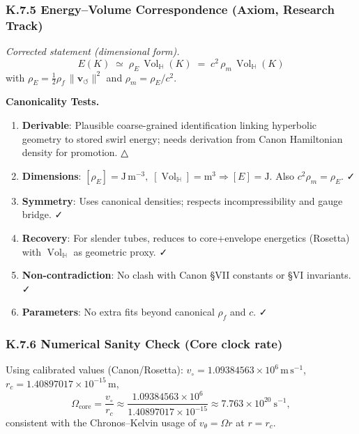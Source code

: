 \documentclass[10pt,reprint,aps,onecolumn,nofootinbib]{revtex4-2}
\newcommand{\Vol}{\operatorname{Vol}}   %
\begin{document}
    \subsubsection*{K.7.5 Energy–Volume Correspondence (Axiom, Research Track)}
    \emph{Corrected statement (dimensional form).}
    \[
        \boxed{\;E(K)\;\simeq\;\rho_{\!E}\,\Vol_{\!\mathbb{H}}(K)\;=\;c^{2}\,\rho_{\!m}\,\Vol_{\!\mathbb{H}}(K)\;}
    \]
    with $\rho_{\!E}=\tfrac12 \rho_{\!f}\,\lVert \mathbf{v}_{\!\boldsymbol{\circlearrowleft}}\rVert^{2}$ and $\rho_{\!m}=\rho_{\!E}/c^{2}$.

    \textbf{Canonicality Tests.}
    \begin{enumerate}
        \item \textbf{Derivable}: Plausible coarse-grained identification linking hyperbolic geometry to stored swirl energy; needs derivation from Canon Hamiltonian density for promotion. △
        \item \textbf{Dimensions}: $[\rho_{\!E}]=\mathrm{J\,m^{-3}},\; [\Vol_{\!\mathbb{H}}]=\mathrm{m^3}\Rightarrow [E]=\mathrm{J}$. Also $c^{2}\rho_{\!m}=\rho_{\!E}$. ✓
        \item \textbf{Symmetry}: Uses canonical densities; respects incompressibility and gauge bridge. ✓
        \item \textbf{Recovery}: For slender tubes, reduces to core+envelope energetics (Rosetta) with $\Vol_{\!\mathbb{H}}$ as geometric proxy. ✓
        \item \textbf{Non-contradiction}: No clash with Canon §VII constants or §VI invariants. ✓
        \item \textbf{Parameters}: No extra fits beyond canonical $\rho_{\!f}$ and $c$. ✓
    \end{enumerate}

    \subsubsection*{K.7.6 Numerical Sanity Check (Core clock rate)}
    Using calibrated values (Canon/Rosetta): $v_\circ=1.09384563\times 10^{6}\,\mathrm{m\,s^{-1}}$,
    $r_c=1.40897017\times 10^{-15}\,\mathrm{m}$,
    \[
        \Omega_{\text{core}}=\frac{v_\circ}{r_c}\approx
        \frac{1.09384563\times 10^{6}}{1.40897017\times 10^{-15}}
        \approx 7.763\times 10^{20}\ \mathrm{s^{-1}},
    \]
    consistent with the Chronos–Kelvin usage of $v_\theta=\Omega r$ at $r=r_c$.
\end{document}
